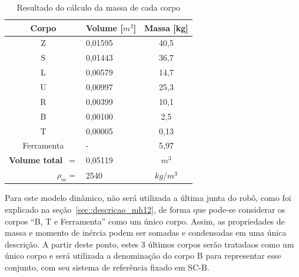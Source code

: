 \begin{table}[h]
\centering
\caption{Resultado do cálculo da massa de cada corpo}
\label{tab::massa_mh12}
\begin{tabular}{@{}clc@{}}
\toprule
\textbf{Corpo}                      & \textbf{Volume} [$m^3$] & \multicolumn{1}{l}{\textbf{Massa} [kg]} \\ \midrule 
Z 									& 0,01595         & 40,5							   \\
S                                   & 0,01443         & 36,7                               \\
L                                   & 0,00579         & 14,7                               \\
U                                   & 0,00997         & 25,3                               \\
R                                   & 0,00399         & 10,1                               \\
B                                   & 0,00100         & 2,5                                \\
T                                   & 0,00005         & 0,13                               \\
Ferramenta                          & -		          & 5,97							   \\ \midrule
\textbf{Volume total}~$=$           & 0,05119        & \multicolumn{1}{c}{$m^3$}	       \\
\multicolumn{1}{r}{\textbf{$\rho_m =$}} & 2540          &
\multicolumn{1}{c}{$kg/{m^3}$}     \\ \bottomrule
\end{tabular}
\end{table}
%

Para este modelo dinâmico, não será utilizada a última junta do robô, como foi
explicado na seção~\ref{sec::descricao_mh12}, de forma que pode-se considerar os
corpos ``B, T e Ferramenta'' como um único corpo. Assim, as propriedades de
massa e momento de inércia podem ser somadas e condensadas em uma única
descrição. A partir deste ponto, estes 3 últimos corpos serão tratadaos como um
único corpo e será utilizada a denominação do corpo B para representar esse
conjunto, com seu sistema de referência fixado em SC-B.

